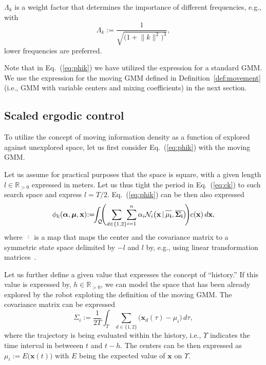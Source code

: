 \documentclass[letterpaper,10pt,conference,twoside]{IEEEtran}
\theoremstyle{definition}
\begin{document}
$\Lambda_k$ is a weight factor that determines the importance of different frequencies, e.g., with
\begin{equation}
  \Lambda_k:=\frac{1}{\sqrt{\big(1+\lVert{k}\rVert^2\big)^3}},
\end{equation}
lower frequencies are preferred.

Note that in Eq.~(\ref{eq:phik}) we have utilized the expression for a standard GMM. 
We use the expression for the moving GMM defined in Definition~\ref{def:movement} (i.e., GMM with variable centers and mixing coefficients) in the next section.












\subsection{Scaled ergodic control}
\label{sec:sol}
\noindent
To utilize the concept of moving information density as a function of explored against unexplored space, let us first consider Eq.~(\ref{eq:phik}) with the moving GMM.

Let us assume for practical purposes that the space is square, with a given length $l\in\mathbb{R}_{>0}$ expressed in meters.
Let us thus tight the period in Eq.~(\ref{eq:ck}) to such search space and express $l=T/2$. Eq.~(\ref{eq:phik}) can be then also expressed
\begin{equation}
  \phi_k(\boldsymbol{\alpha},\boldsymbol{\mu},\mathbf{x})\hspace*{-.6ex}:=\hspace*{-1ex}\int_{\mathcal{Q}}{\hspace*{-1ex}\Bigg(\hspace*{-.3ex}\sum_{d\in\{1,2\}}\hspace*{-.5ex}\sum_{i=1}^n\alpha_i\mathcal{N}_i\big(\mathbf{x\,|\,\overline{\rule{0pt}{2.4mm}{\mu_i}},\overline{\Sigma_i}}\big)\hspace*{-.5ex}\Bigg)\hspace*{-.1ex}c(\mathbf{x})\,d\mathbf{x}},
\end{equation}
where $\overline{\,\cdot\,}$ is a map that maps the center and the covariance matrix to a symmetric state space delimited by $-l$ and $l$ by, e.g., using linear transformation matrices~\cite{calinon2020mixture}.

Let us further define a given value that expresses the concept of ``history.'' If this value is expressed by, $h\in\mathbb{R}_{>0}$, we can model the space that has been already explored by the robot exploting the definition of the moving GMM. The covariance matrix can be expressed
\begin{equation}
  \Sigma_i:=\frac{1}{2T}\int_\Upsilon\sum_{d\in\{1,2\}}{\big(\mathbf{x}_d(\tau)-\mu_i\big)}\,d\tau,
\end{equation}
where the trajectory is being evaluated within the history, i.e., $\Upsilon$ indicates the time interval in betweeen $t$ and $t-h$.
%
The centers can be then expressed as $\mu_i:=E\big(\mathbf{x}(t)\big)$ with $E$ being the expected value of $\mathbf{x}$ on $\Upsilon$. 
\end{document}
